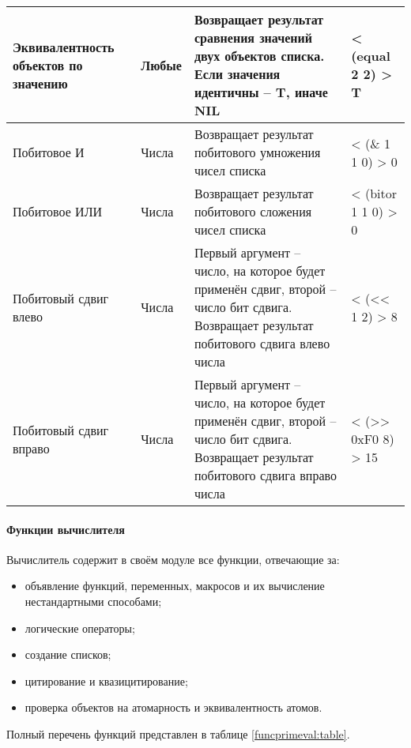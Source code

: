 \begin{xltabular}{\textwidth}{|p{3.6cm}|p{2cm}|p{6cm}|X|}
	Эквивалентность объектов по значению & Любые & Возвращает результат сравнения значений двух объектов списка. Если значения идентичны -- T, иначе NIL & < (equal 2 2) \linebreak > T \\ \hline 
	Побитовое И & Числа & Возвращает результат побитового умножения чисел списка & < (\& 1 1 0) \linebreak > 0 \\ \hline 
	Побитовое ИЛИ & Числа & Возвращает результат побитового сложения чисел списка & < (bitor 1 1 0) \linebreak > 0 \\ \hline 
	Побитовый сдвиг влево & Числа & Первый аргумент -- число, на которое будет применён сдвиг, второй -- число бит сдвига. Возвращает результат побитового сдвига влево числа & < (<< 1 2) \linebreak > 8 \\ \hline 
	Побитовый сдвиг вправо & Числа & Первый аргумент -- число, на которое будет применён сдвиг, второй -- число бит сдвига. Возвращает результат побитового сдвига вправо числа & < (>> 0xF0 8) \linebreak > 15
\end{xltabular}

\paragraph{Функции вычислителя}

Вычислитель содержит в своём модуле все функции, отвечающие за:
\begin{itemize}
	\item объявление функций, переменных, макросов и их вычисление нестандартными способами;
	\item логические операторы;
	\item создание списков;
	\item цитирование и квазицитирование;
	\item проверка объектов на атомарность и эквивалентность атомов.
\end{itemize}

Полный перечень функций представлен в таблице \ref{funcprimeval:table}.

